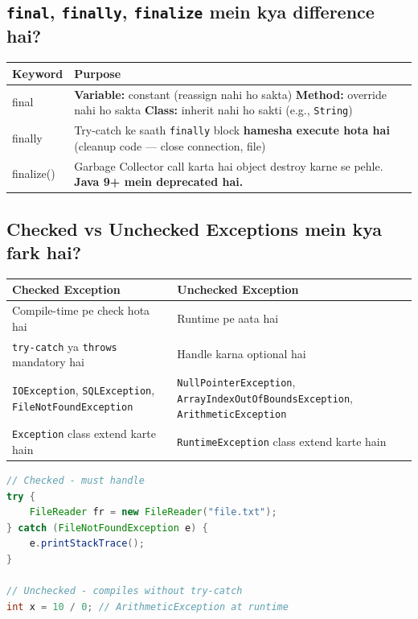 \documentclass[12pt,a4paper]{article}
\begin{document}
\subsection{\texttt{final}, \texttt{finally}, \texttt{finalize} mein kya difference hai?}

\begin{answerbox}
\begin{center}
\begin{tabular}{>{\ttfamily}l p{9cm}}
\toprule
\textbf{Keyword} & \textbf{Purpose} \\
\midrule
final & \textbf{Variable:} constant (reassign nahi ho sakta) \newline \textbf{Method:} override nahi ho sakta \newline \textbf{Class:} inherit nahi ho sakti (e.g., \texttt{String}) \\
\midrule
finally & Try-catch ke saath \texttt{finally} block \textbf{hamesha execute hota hai} (cleanup code --- close connection, file) \\
\midrule
finalize() & Garbage Collector call karta hai object destroy karne se pehle. \textbf{Java 9+ mein deprecated hai.} \\
\bottomrule
\end{tabular}
\end{center}
\end{answerbox}

\subsection{Checked vs Unchecked Exceptions mein kya fark hai?}

\begin{answerbox}
\begin{center}
\begin{tabular}{p{6cm} p{6cm}}
\toprule
\textbf{Checked Exception} & \textbf{Unchecked Exception} \\
\midrule
Compile-time pe check hota hai & Runtime pe aata hai \\
\texttt{try-catch} ya \texttt{throws} mandatory hai & Handle karna optional hai \\
\texttt{IOException}, \texttt{SQLException}, \texttt{FileNotFoundException} & \texttt{NullPointerException}, \texttt{ArrayIndexOutOfBoundsException}, \texttt{ArithmeticException} \\
\texttt{Exception} class extend karte hain & \texttt{RuntimeException} class extend karte hain \\
\bottomrule
\end{tabular}
\end{center}
\begin{lstlisting}[language=Java]
// Checked - must handle
try {
    FileReader fr = new FileReader("file.txt");
} catch (FileNotFoundException e) {
    e.printStackTrace();
}

// Unchecked - compiles without try-catch
int x = 10 / 0; // ArithmeticException at runtime
\end{lstlisting}
\end{answerbox}
\end{document}

